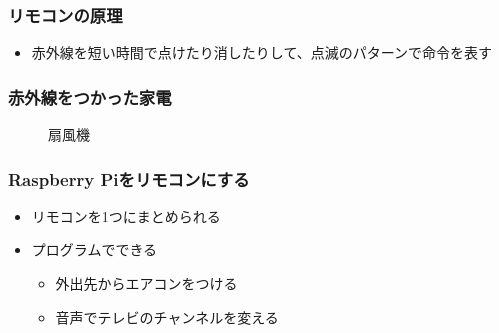\documentclass[slide05.tex]{subfiles}
\begin{document}
\begin{frame}
    \frametitle{リモコンの原理} 
    \vspace{15pt}
    \begin{itemize}
        \item 赤外線を短い時間で点けたり消したりして、点滅のパターンで命令を表す
    \end{itemize}
    \begin{center}
        
    \end{center}
\end{frame}

\begin{frame}
    \frametitle{赤外線をつかった家電}
    \begin{figure}[H]
    \begin{minipage}[t]{0.3\columnwidth}
        \centering
    
        \caption{テレビ}
    \end{minipage}
    \begin{minipage}[t]{0.3\columnwidth}
        \centering
        
        \caption{エアコン}
    \end{minipage}
    \begin{minipage}[t]{0.3\columnwidth}
        \centering
        
        \caption{扇風機}
    \end{minipage}
    \end{figure}
\end{frame}

\begin{frame}
    \frametitle{Raspberry Piをリモコンにする}
    \begin{itemize}
        \item リモコンを1つにまとめられる
        \vspace{10pt}
        \item プログラムでできる
        \begin{itemize}
            \item 外出先からエアコンをつける
            \item 音声でテレビのチャンネルを変える
        \end{itemize}
    \end{itemize}
\end{frame}
\end{document}
